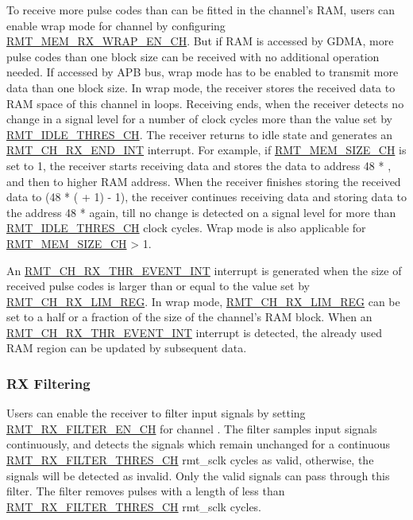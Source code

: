 \documentclass[main\_\_EN.tex]{subfiles}
\begin{document}
To receive more pulse codes than can be fitted in the channel's RAM, users can enable wrap mode for channel  by configuring \hyperref[fielddesc:RMTMEMRXWRAPENCHM]{RMT\_MEM\_RX\_WRAP\_EN\_CH}. But if RAM is accessed by GDMA, more pulse codes than one block size can be received with no additional operation needed. If accessed by APB bus, wrap mode has to be enabled to transmit more data than one block size. In wrap mode, the receiver stores the received data to RAM space of this channel in loops. Receiving ends, when the receiver detects no change in a signal level for a number of clock cycles more than the value set by \hyperref[fielddesc:RMTIDLETHRESCHM]{RMT\_IDLE\_THRES\_CH}. The receiver returns to idle state and generates an \hyperref[int:RMTCHMRXENDINT]{RMT\_CH\_RX\_END\_INT} interrupt. For example, if \hyperref[fielddesc:RMTMEMSIZECHM]{RMT\_MEM\_SIZE\_CH} is set to 1, the receiver starts receiving data and stores the data to address 48 * , and then to higher RAM address. When the receiver finishes storing the received data to (48 * ( + 1) - 1), the receiver continues receiving data and storing data to the address 48 *   again, till no change is detected on a signal level for more than \hyperref[fielddesc:RMTIDLETHRESCHM]{RMT\_IDLE\_THRES\_CH} clock cycles. Wrap mode is also applicable for \hyperref[fielddesc:RMTMEMSIZECHM]{RMT\_MEM\_SIZE\_CH} > 1.

An \hyperref[int:RMTCHMRXTHREVENTINT]{RMT\_CH\_RX\_THR\_EVENT\_INT} interrupt is generated when the size of received pulse codes is larger than or equal to the value set by \hyperref[fielddesc:RMTCHMRXLIMREG]{RMT\_CH\_RX\_LIM\_REG}.
In wrap mode, \hyperref[fielddesc:RMTCHMRXLIMREG]{RMT\_CH\_RX\_LIM\_REG} can be set to a half or a fraction of the size of the channel's RAM block.
When an \hyperref[int:RMTCHMRXTHREVENTINT]{RMT\_CH\_RX\_THR\_EVENT\_INT} interrupt is detected, the already used RAM region can be updated by subsequent data.


\subsubsection{RX Filtering}

Users can enable the receiver to filter input signals by setting \hyperref[fielddesc:RMTRXFILTERENCHM]{RMT\_RX\_FILTER\_EN\_CH} for channel . The filter samples input signals continuously, and detects the signals which remain unchanged for a continuous \hyperref[fielddesc:RMTRXFILTERTHRESCHM]{RMT\_RX\_FILTER\_THRES\_CH} rmt\_sclk cycles as valid, otherwise, the signals will be detected as invalid. Only the valid signals can pass through this filter. The filter removes pulses with a length of less than \hyperref[fielddesc:RMTRXFILTERTHRESCHM]{RMT\_RX\_FILTER\_THRES\_CH} rmt\_sclk cycles.
\end{document}
